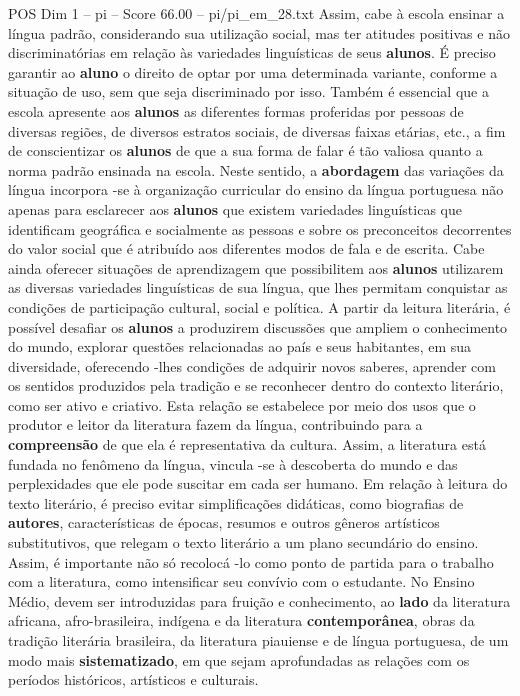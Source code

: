 \begin{textsample}{POS Dim 1 – pi – Score 66.00 – pi/pi\_em\_28.txt}
Assim, cabe à escola ensinar a língua padrão, considerando sua utilização social, mas ter atitudes positivas e não discriminatórias em relação às variedades linguísticas de seus \textbf{alunos}.
É preciso garantir ao \textbf{aluno} o direito de optar por uma determinada variante, conforme a situação de uso, sem que seja discriminado por isso.
Também é essencial que a escola apresente aos \textbf{alunos} as diferentes formas proferidas por pessoas de diversas regiões, de diversos estratos sociais, de diversas faixas etárias, etc., a fim de conscientizar os \textbf{alunos} de que a sua forma de falar é tão valiosa quanto a norma padrão ensinada na escola.
Neste sentido, a \textbf{abordagem} das variações da língua incorpora -se à organização curricular do ensino da língua portuguesa não apenas para esclarecer aos \textbf{alunos} que existem variedades linguísticas que identificam geográfica e socialmente as pessoas e sobre os preconceitos decorrentes do valor social que é atribuído aos diferentes modos de fala e de escrita.
Cabe ainda oferecer situações de aprendizagem que possibilitem aos \textbf{alunos} utilizarem as diversas variedades linguísticas de sua língua, que lhes permitam conquistar as condições de participação cultural, social e política.
A partir da leitura literária, é possível desafiar os \textbf{alunos} a produzirem discussões que ampliem o conhecimento do mundo, explorar questões relacionadas ao país e seus habitantes, em sua diversidade, oferecendo -lhes condições de adquirir novos saberes, aprender com os sentidos produzidos pela tradição e se reconhecer dentro do contexto literário, como ser ativo e criativo.
Esta relação se estabelece por meio dos usos que o produtor e leitor da literatura fazem da língua, contribuindo para a \textbf{compreensão} de que ela é representativa da cultura.
Assim, a literatura está fundada no fenômeno da língua, vincula -se à descoberta do mundo e das perplexidades que ele pode suscitar em cada ser humano.
Em relação à leitura do texto literário, é preciso evitar simplificações didáticas, como biografias de \textbf{autores}, características de épocas, resumos e outros gêneros artísticos substitutivos, que relegam o texto literário a um plano secundário do ensino.
Assim, é importante não só recolocá -lo como ponto de partida para o trabalho com a literatura, como intensificar seu convívio com o estudante.
No Ensino Médio, devem ser introduzidas para fruição e conhecimento, ao \textbf{lado} da literatura africana, afro-brasileira, indígena e da literatura \textbf{contemporânea}, obras da tradição literária brasileira, da literatura piauiense e de língua portuguesa, de um modo mais \textbf{sistematizado}, em que sejam aprofundadas as relações com os períodos históricos, artísticos e culturais.

\end{textsample}
